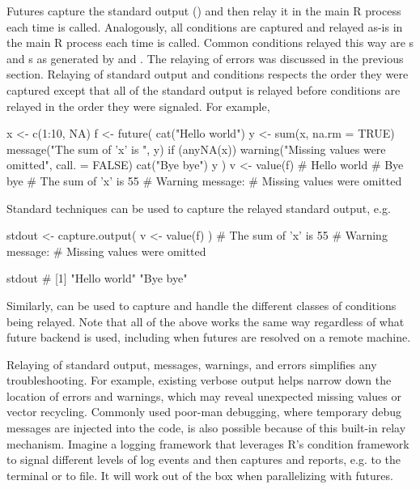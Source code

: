 Futures capture the standard output () and then relay it
in the main R process each time  is called. Analogously,
all conditions are captured and relayed as-is in the main R process
each time  is called. Common conditions relayed this way
are s and s as generated by 
and .  The relaying of errors was discussed in the
previous section.  Relaying of standard output and conditions respects
the order they were captured except that all of the standard output is
relayed before conditions are relayed in the order they were
signaled. For example,
%
\begin{example}
x <- c(1:10, NA)
f <- future({
  cat("Hello world\n")
  y <- sum(x, na.rm = TRUE)
  message("The sum of 'x' is ", y)
  if (anyNA(x)) warning("Missing values were omitted", call. = FALSE)
  cat("Bye bye\n")
  y
})
v <- value(f)
# Hello world
# Bye bye
# The sum of 'x' is 55
# Warning message:
# Missing values were omitted
\end{example}
%
Standard techniques can be used to capture the relayed standard
output, e.g.
\begin{example}
stdout <- capture.output({
  v <- value(f)
})
# The sum of 'x' is 55
# Warning message:
# Missing values were omitted

stdout
# [1] "Hello world" "Bye bye"
\end{example}
%
Similarly,  can be used to capture and
handle the different classes of conditions being relayed.  Note that
all of the above works the same way regardless of what future backend
is used, including when futures are resolved on a remote machine.

Relaying of standard output, messages, warnings, and errors simplifies
any troubleshooting. For example, existing verbose output helps narrow
down the location of errors and warnings, which may reveal unexpected
missing values or vector recycling. Commonly used poor-man debugging,
where temporary debug messages are injected into the code, is also
possible because of this built-in relay mechanism.  Imagine a logging
framework that leverages R's condition framework to signal different
levels of log events and then captures and reports, e.g. to the
terminal or to file.  It will work out of the box when parallelizing
with futures.


